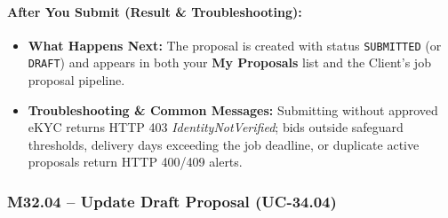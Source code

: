\paragraph{After You Submit (Result \& Troubleshooting):}
\begin{itemize}[leftmargin=1.5em,itemsep=2pt]
  \item \textbf{What Happens Next:} The proposal is created with status \texttt{SUBMITTED} (or \texttt{DRAFT}) and appears in both your \textbf{My Proposals} list and the Client's job proposal pipeline.
  \item \textbf{Troubleshooting \& Common Messages:} Submitting without approved eKYC returns HTTP 403 \textit{IdentityNotVerified}; bids outside safeguard thresholds, delivery days exceeding the job deadline, or duplicate active proposals return HTTP 400/409 alerts.
\end{itemize}

\newpage
\subsubsection{M32.04 -- Update Draft Proposal (UC-34.04)}

